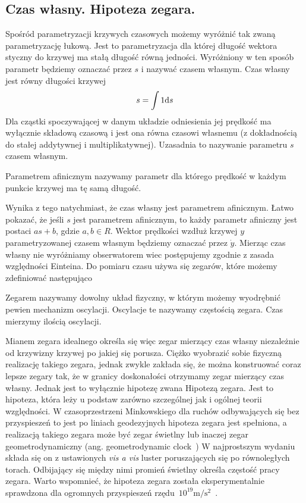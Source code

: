 \subsection{Czas własny. Hipoteza zegara.}
Spośród parametryzacji krzywych czasowych
 możemy wyróżnić tak zwaną parametryzację łukową.
Jest to parametryzacja dla której długość 
wektora styczny do krzywej ma stałą długość równą jedności.
Wyróżniony w ten sposób parametr będziemy oznaczać przez 
$s$ i nazywać czasem własnym.
Czas własny jest równy długości krzywej
\begin{align*}
s = \int 1 \text{d} s
\end{align*}
Dla cząstki spoczywającej w danym układzie odniesienia jej prędkość
ma wyłącznie składową czasową i jest 
ona równa czasowi własnemu (z dokładnością
do stałej addytywnej i multiplikatywnej). 
Uzasadnia to nazywanie parametru $s$ czasem własnym.
\begin{definition}
Parametrem afinicznym nazywamy parametr dla którego 
prędkość w każdym punkcie krzywej ma tę samą długość.
\end{definition}
Wynika z tego natychmiast, że czas własny jest parametrem afinicznym.
Łatwo pokazać, że jeśli $s$ jest 
parametrem afinicznym, to każdy parametr afiniczny 
jest postaci $a s+b$, gdzie $a,b\in R$.
Wektor prędkości wzdłuż krzywej $y$ parametryzowanej czasem 
własnym będziemy oznaczać przez $\dot{y}$.
Mierząc czas własny nie wyróżniamy obserwatorem wiec 
postępujemy zgodnie z zasada względności Einteina. 
Do pomiaru czasu używa się zegarów, które możemy 
zdefiniować następująco
\begin{definition}
Zegarem nazywamy dowolny układ fizyczny, w którym możemy wyodrębnić pewien
mechanizm oscylacji. Oscylacje te nazywamy częstością zegara. Czas mierzymy
ilością oscylacji.
\end{definition}
Mianem zegara idealnego określa się więc zegar mierzący czas własny
niezależnie od krzywizny krzywej po jakiej się porusza.
Ciężko wyobrazić sobie fizyczną realizację takiego zegara, jednak
zwykle zakłada się, że można konstruować coraz lepsze zegary 
tak, że w granicy doskonałości otrzymamy zegar mierzący czas własny. 
Jednak jest to wyłącznie hipotezę zwana Hipotezą zegara.
Jest to hipoteza, która leży u podstaw zarówno 
szczególnej jak i ogólnej teorii względności. 
W czasoprzestrzeni Minkowskiego dla 
ruchów odbywających się bez przyspieszeń 
to jest po liniach geodezyjnych
hipoteza zegara jest spełniona, a 
realizacją takiego zegara może być zegar świetlny lub inaczej
zegar geometrodynamiczny (ang. geometrodynamic 
clock~\cite{ohanian2013gravitation})
W najprostszym wydaniu składa się on z ustawionych 
\textit{vis a vis} luster poruszających się po równoległych torach.
Odbijający się między nimi promień świetlny 
określa częstość pracy zegara. 
Warto wspomnieć, że hipoteza zegara 
została eksperymentalnie sprawdzona dla ogromnych 
przyspieszeń rzędu~$10^{19}\si{\metre\per\second^2}$~\cite{Bailey1977}.

